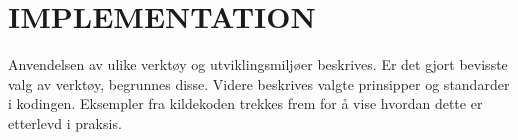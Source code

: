 \chapter{IMPLEMENTATION}
Anvendelsen av ulike verktøy og utviklingsmiljøer beskrives. Er det gjort bevisste valg av
verktøy, begrunnes disse. Videre beskrives valgte prinsipper og standarder i kodingen. Eksempler
fra kildekoden trekkes frem for å vise hvordan dette er etterlevd i praksis.

